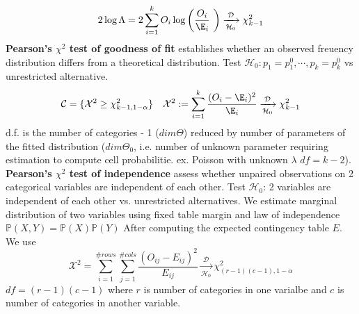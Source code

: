 \documentclass[8pt]{article}
\begin{document}
\begin{multicols}{3}
{   \[
    2\log \Lambda = 2 \sum_{i=1}^k O_i \log{\left( \frac{O_i}{\E_i} \ \right)} \xrightarrow[\mathcal{H}_0]{\mathcal{D}} \chi_{k-1}^2
   \]
   \textbf{Pearson's $\chi^2$ test of goodness of fit} establishes whether an observed freuency distribution differs from a theoretical distribution. Test $\mathcal{H}_0: p_1 = p_1^0, \cdots, p_k = p_k^0$ vs unrestricted alternative.
   \[
     \mathcal{C} =\{ \mathcal{X}^2 \geq \chi_{k-1, 1-\alpha}^2 \} \quad \mathcal{X}^2 := \sum_{i=1}^k \frac{(O_i - \E_i)^2}{\E_i} \xrightarrow[\mathcal{H}_0]{\mathcal{D}} \chi_{k-1}^2
   \]
    d.f. is the number of categories - 1 ($dim\Theta$) reduced by number of parameters of the fitted distribution ($dim\Theta_0$, i.e. number of unknown parameter requiring estimation to compute cell probabilitie. ex. Poisson with unknown $\lambda$ $df = k -2$).\\
   \textbf{Pearson's $\chi^2$ test of independence} assess whether unpaired observations on 2 categorical variables are independent of each other. Test $\mathcal{H}_0$: 2 variables are independent of each other vs. unrestricted alternatives. We estimate marginal distribution of two variables using fixed table margin and law of independence $\mathbb{P}(X, Y) = \mathbb{P}(X) \mathbb{P}(Y)$ After computing the expected contingency table $E$. We use
   \[
     \mathcal{X}^2 = \sum_{i=1}^{\#rows} \sum_{j=1}^{\#cols} \frac{(O_{ij} - E_{ij})^2}{E_{ij}}  \xrightarrow[\mathcal{H}_0]{\mathcal{D}} \chi_{(r-1)(c-1), 1-\alpha}^2
   \]
   $df = (r -1)(c-1)$ where $r$ is number of categories in one varialbe and $c$ is number of categories in another variable.
}
\end{multicols}
\end{document}
